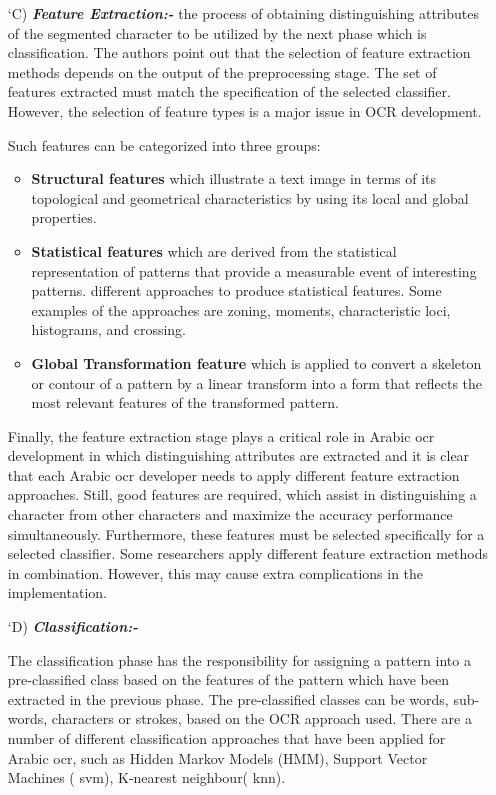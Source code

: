 \begin{itemize}[labelindent=1em,labelsep=0.25cm,leftmargin=*]
        \item[\char `C)] \textit{\textbf{Feature Extraction:-}} 
        the process of obtaining distinguishing attributes of the segmented character to be utilized by the next phase which is classification. The authors point out that the selection of feature extraction methods depends on the output of the preprocessing stage. The set of features extracted must match the specification of the selected classifier. However, the selection of feature types is a major issue in OCR development.

Such features can be categorized into three groups: 
\begin{itemize}[itemsep=1pt, topsep=5pt]
    \item \textbf{Structural features} which illustrate a text image in terms of its topological and geometrical characteristics by using its local and global properties.

    \item \textbf{Statistical features} which are derived from the statistical representation of patterns that provide a measurable event of interesting patterns. different approaches to produce statistical features. Some examples of the approaches are zoning, moments, characteristic loci, histograms, and crossing.

     \item \textbf{Global Transformation feature} which is applied to convert a skeleton or contour of a pattern by a linear transform into a form that reflects the most relevant features of the transformed pattern.
\end{itemize} 

Finally, the feature extraction stage plays a critical role in Arabic  \acrshort{ocr} development in which distinguishing attributes are extracted and it is clear that each Arabic \acrshort{ocr} developer needs to apply different feature extraction approaches. Still, good features are required, which assist in distinguishing a character from other characters and maximize the accuracy performance simultaneously. Furthermore, these features must be selected specifically for a selected classifier. Some researchers apply different feature extraction methods in combination. However, this may cause extra complications in the implementation.

     
        
        \item[\char `D)] \textit{\textbf{Classification:-}}
        
        The classification phase has the responsibility for assigning a pattern into a pre-classified class based on the features of the pattern which have been extracted in the previous phase. The pre-classified classes can be words, sub-words, characters or strokes, based on the OCR approach used. There are a number of different classification approaches that have been applied for Arabic  \acrshort{ocr}, such as Hidden Markov Models (HMM), Support Vector Machines ( \acrshort{svm}), K-nearest neighbour( \acrshort{knn}).
        

\end{itemize}
